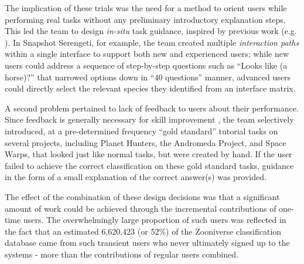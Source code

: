 \documentclass{sigchi}
\begin{document}


The implication of these trials was the need for a method to orient users while performing real tasks without any preliminary introductory explanation steps. This led the team to design \emph{in-situ} task guidance, inspired by previous work (e.g. \cite{ockerman2000review}).  In Snapshot Serengeti, for example, the team created multiple \emph{interaction paths} within a single interface to support both new and experienced users; while new users could address a sequence of step-by-step questions such as ``Looks like (a horse)?'' that narrowed options down in ``40 questions'' manner, advanced users could directly select the relevant species they identified from an interface matrix.  

A second problem pertained to lack of feedback to users about their performance.  Since feedback is generally necessary for skill improvement \cite{kluger1996effects}, the team selectively introduced, at a pre-determined frequency ``gold standard''  tutorial tasks on several projects, including Planet Hunters, the Andromeda Project, and Space Warps, that looked just like normal tasks, but were created by hand.  If the user failed to achieve the correct classification on these gold standard tasks, guidance in the form of a small explanation of the correct answer(s) was provided.   

The effect of the combination of these design decisions was that a significant amount of work could be achieved through the incremental contributions of one-time users.  The overwhelmingly large proportion of such users was reflected in the fact that an estimated 6,620,423 (or 52\%) of the Zooniverse classification database came from such transient users who never ultimately signed up to the systems - more than the contributions of regular users combined.  %
\end{document}
